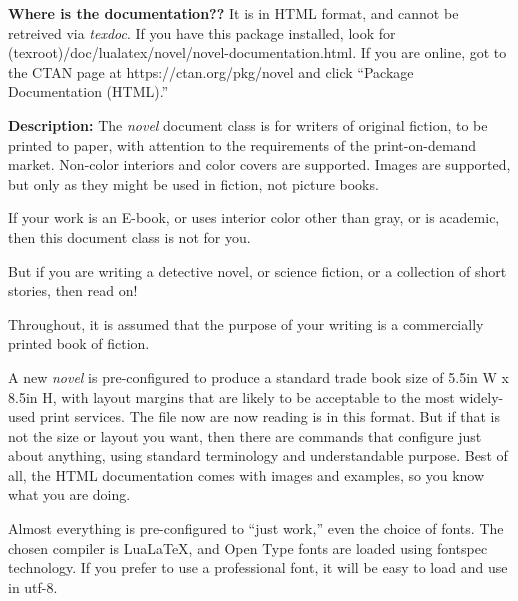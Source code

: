 \documentclass{novel} %
\begin{document}
\begin{ChapterStart}[8]
\vspace{\nbs} %
\vspace{\nbs}
\vspace{\nbs}
\end{ChapterStart}

\textbf{Where is the documentation??} It is in HTML format, and cannot be retreived via  \textit{texdoc}. If you have this package installed, look for (texroot)/doc/lualatex/novel/novel-documentation.html. If you are online, got to the CTAN page at https://ctan.org/pkg/novel and click ``Package Documentation (HTML).''

\scenebreak

\textbf{Description:} The \emph{novel} document class is for writers of original fiction, to be printed to paper, with attention to the requirements of the print-on-demand market. Non-color interiors and color covers are supported. Images are supported, but only as they might be used in fiction, not picture books.

If your work is an E-book, or uses interior color other than gray, or is academic, then this document class is not for you. 

But if you are writing a detective novel, or science fiction, or a collection of short stories, then read on!


Throughout, it is assumed that the purpose of your writing is a commercially printed book of fiction.

A new \emph{novel} is pre-configured to produce a standard trade book size of 5.5in W x 8.5in H, with layout margins that are likely to be acceptable to the most widely-used print services. The file now are now reading is in this format. But if that is not the size or layout you want, then there are commands that configure just about anything, using standard terminology and understandable purpose. Best of all, the HTML documentation comes with images and examples, so you know what you are doing.

Almost everything is pre-configured to “just work,” even the choice of fonts. The chosen compiler is LuaLaTeX, and Open Type fonts are loaded using fontspec technology. If you prefer to use a professional font, it will be easy to load and use in utf-8.
\end{document}
